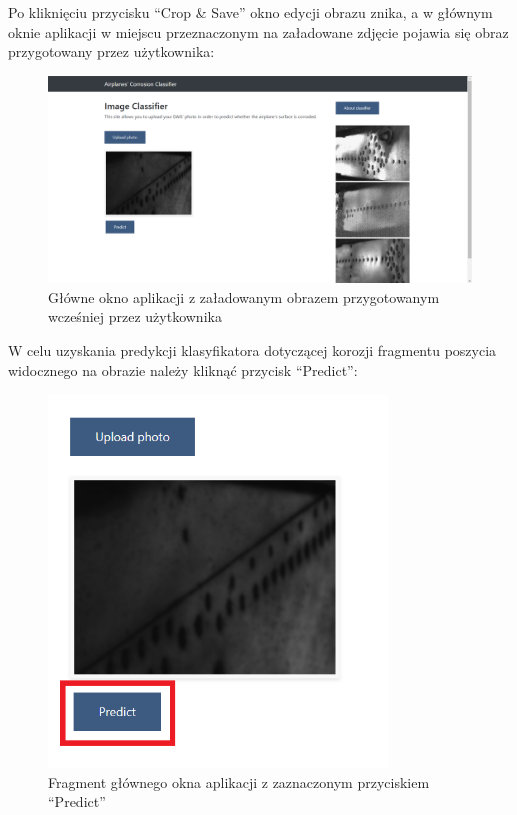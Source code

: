\documentclass[polish,12pt]{aghthesis}
\begin{document}
\noindent Po kliknięciu przycisku ``Crop \& Save'' okno edycji obrazu znika, a w głównym oknie aplikacji w miejscu przeznaczonym na załadowane zdjęcie pojawia się obraz przygotowany przez użytkownika:
\begin{figure}[H]%
\centering
\includegraphics[width=16cm]{images/zaladowanyObraz.PNG}
\caption{Główne okno aplikacji z załadowanym obrazem przygotowanym wcześniej przez użytkownika}
\end{figure}

\noindent W celu uzyskania predykcji klasyfikatora dotyczącej korozji fragmentu poszycia widocznego na obrazie należy kliknąć przycisk ``Predict'':
\begin{figure}[H]%
\centering
\includegraphics[width=9cm]{images/predict.PNG}
\caption{Fragment głównego okna aplikacji z zaznaczonym przyciskiem ``Predict''}
\end{figure}
\end{document}

